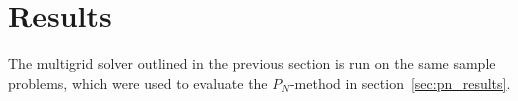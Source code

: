 \section{Results}
\label{sec:da_results}

The multigrid solver outlined in the previous section is run on the same sample problems, which were used to evaluate the $P_N$-method in section~\ref{sec:pn_results}.
